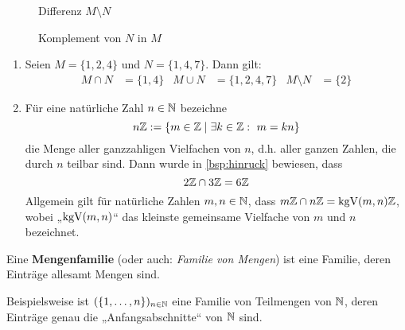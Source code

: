 \begin{defin}
\begin{figure}[ht]
\begin{minipage}{.48\textwidth}
            \caption{Differenz $M\setminus N$}
        \end{minipage}
        \quad
        \begin{minipage}{.48\textwidth}
            \centering
            \caption{Komplement von $N$ in $M$}
        \end{minipage}
    \end{figure}
\end{defin}


\begin{bsp} \quad
    \begin{enumerate}
        \item Seien $ M = \{1, 2, 4\}$ und $N = \{1, 4, 7\}$. Dann gilt: 
	\begin{align*}
            M \cap N &= \{1, 4\} & M \cup N &= \{1, 2, 4, 7\} & M \setminus N &= \{2\}
	\end{align*}
        \item Für eine natürliche Zahl $n\in \mathbb N$ bezeichne
            \[ n\mathbb Z := \{ m\in \mathbb Z \mid \exists k\in \mathbb Z:\ m=kn \} \]
        die Menge aller ganzzahligen Vielfachen von $n$, d.h. aller ganzen Zahlen, die durch $n$ teilbar sind. Dann wurde in \cref{bsp:hinruck} bewiesen, dass
            \[ 2\mathbb Z \cap 3\mathbb Z = 6\mathbb Z \]
        Allgemein gilt für natürliche Zahlen $m,n\in \mathbb N$, dass $m\mathbb Z\cap n\mathbb Z = \operatorname{kgV}(m,n)\mathbb Z$, wobei „$\operatorname{kgV}(m,n)$“ das kleinste gemeinsame Vielfache von $m$ und $n$ bezeichnet.
    \end{enumerate}
\end{bsp}


\begin{defin}[Mengenfamilie] 
    Eine \textbf{Mengenfamilie} (oder auch: \emph{Familie von Mengen}) ist eine Familie, deren Einträge allesamt Mengen sind.
\end{defin}


\begin{bsp}
    Beispielsweise ist $(\{1,\dots , n\})_{n\in \mathbb N}$ eine Familie von Teilmengen von $\mathbb N$, deren Einträge genau die „Anfangsabschnitte“ von $\mathbb N$ sind.
\end{bsp}


